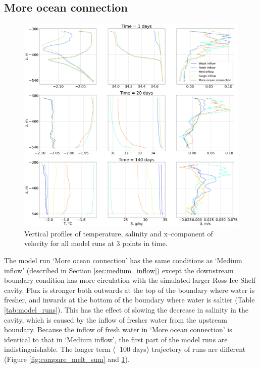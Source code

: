 \subsection{More ocean connection} \label{sec:fresh_output}

\begin{figure}[!ht]
\centering
\includegraphics[width=1\textwidth]{chapters/4/compare_all_TSU.png}
\caption[All model runs comparison (T,S,U)]{Vertical profiles of temperature, salinity and x--component of velocity for all model runs at 3 points in time.}
\label{fig:compare_all_TSU}
\end{figure}

The model run `More ocean connection' has the same conditions  as `Medium inflow' (described in Section \ref{sec:medium_inflow})  except the downstream boundary condition has more circulation with the simulated larger Ross Ice Shelf cavity. Flux is stronger both outwards at the top of the boundary where water is fresher, and inwards at the bottom of the boundary where water is saltier (Table \ref{tab:model_runs}). This has the effect of slowing the decrease in salinity in the cavity, which is caused by the inflow of fresher water from the upstream boundary. Because the inflow of fresh water in `More ocean connection' is identical to that in `Medium inflow', the first part of the model runs are indistinguishable. The longer term ($\>$ 100 days) trajectory of runs are different (Figure \ref{fig:compare_melt_sum} and \ref{fig:compare_all_TSU}).

